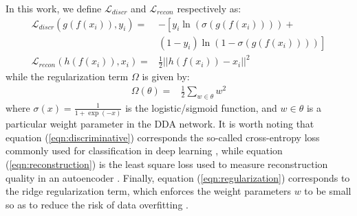 In this work, we define $\mathcal{L}_{discr}$ and $\mathcal{L}_{recon}$ respectively as:
\begin{align}
\label{eqn:discriminative}
\mathcal{L}_{discr}(g(f(x_i)), y_i) = &-\left[ y_i \ln\left( \sigma(g(f(x_i))) \right) \right. + \nonumber\\
                                       &\left. (1 - y_i) \ln\left( 1 - \sigma(g(f(x_i))) \right)  \right]\\
\label{eqn:reconstruction}
\mathcal{L}_{recon}(h(f(x_i)), x_i) = &\frac{1}{2} || h(f(x_i)) - x_i ||^2
\end{align}
while the regularization term $\Omega$ is given by:
\begin{align}
\label{eqn:regularization}
\Omega(\theta) = &\frac{1}{2} \sum_{w \in \theta} w^2 
\end{align}
where $\sigma(x) = \frac{1}{1 + \exp(-x)}$ is the logistic/sigmoid function, and $w \in \theta$ is a particular weight parameter in the DDA network. It is worth noting that equation (\ref{eqn:discriminative}) corresponds the so-called cross-entropy loss commonly used for classification in deep learning \cite{Rosasco2004}, while equation (\ref{eqn:reconstruction}) is the least square loss used to measure reconstruction quality in an autoencoder \cite{Vincent2010}. Finally, equation (\ref{eqn:regularization}) corresponds to the ridge regularization term, which enforces the weight parameters $w$ to be small so as to reduce the risk of data overfitting \cite{bishop2006pattern}. 



